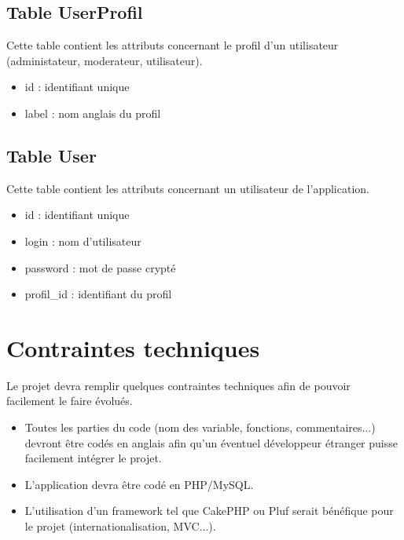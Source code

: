 \documentclass[10pt,a4paper]{article}
\begin{document}
\subsection{Table UserProfil}

Cette table contient les attributs concernant le profil d'un utilisateur (administateur, moderateur, utilisateur).

\begin{itemize}
\item id : identifiant unique
\item label : nom anglais du profil
\end{itemize}

\subsection{Table User}

Cette table contient les attributs concernant un utilisateur de l'application.

\begin{itemize}
\item id : identifiant unique
\item login : nom d'utilisateur
\item password : mot de passe crypté
\item profil\_id : identifiant du profil
\end{itemize}

\section{Contraintes techniques}

Le projet devra remplir quelques contraintes techniques afin de pouvoir facilement le faire évolués.

\begin{itemize}
\item Toutes les parties du code (nom des variable, fonctions, commentaires...) devront être codés en anglais afin qu'un éventuel développeur étranger puisse facilement intégrer le projet.
\item L'application devra être codé en PHP/MySQL.
\item L'utilisation d'un framework tel que CakePHP ou Pluf serait bénéfique pour le projet (internationalisation, MVC...).
\end{itemize}
\end{document}
